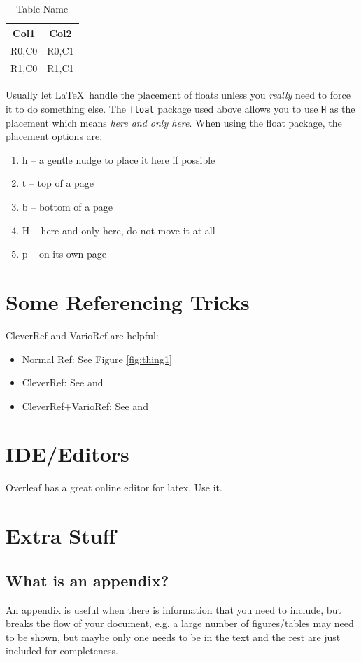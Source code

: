\documentclass[a4paper,twoside,12pt]{report}
\begin{document}
\begin{table}[p]
	\centering
	\caption{Table Name}
	\label{tab:tab1}
\begin{tabular}{cc}
	\hline
	Col1 & Col2\\
	\hline\hline 
	R0,C0 & R0,C1 \\ 
	R1,C0 & R1,C1 \\ 
	\hline
\end{tabular} 
\end{table}

Usually let \LaTeX\ handle the placement of floats unless you \textit{really} need to force it to do something else. The \texttt{float} package used above allows you to use \texttt{H} as the placement which means \textit{here and only here}. When using the float package, the placement options are:
\begin{enumerate}
\item h -- a gentle nudge to place it here if possible
\item t -- top of a page
\item b -- bottom of a page
\item H -- here and only here, do not move it at all
\item p -- on its own page
\end{enumerate}


\chapter{Some Referencing Tricks}
CleverRef and VarioRef are helpful:
\begin{itemize}
	\item Normal Ref: See Figure \ref{fig:thing1}
	\item CleverRef: See  and 
	\item CleverRef+VarioRef: See  and 
\end{itemize}

\chapter{IDE/Editors}
Overleaf has a great online editor for latex. Use it. 

\appendix
\chapter{Extra Stuff}\label{app:extra}
\section{What is an appendix?}\label{app:whatis}

An appendix is useful when there is information that you need to include, but breaks the flow of your document, e.g. a large number of figures/tables may need to be shown, but maybe only one needs to be in the text and the rest are just included for completeness.

\nocite{*}

\end{document}

